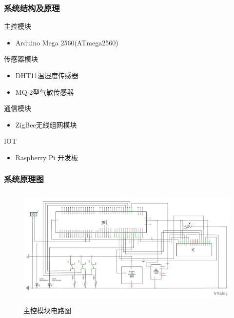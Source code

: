 ﻿\documentclass{beamer}
\begin{document}
\begin{frame}
  \frametitle{系统结构及原理}
  \begin{block}{主控模块}
	\begin{itemize}
		\item Arduino Mega 2560(ATmega2560)
	\end{itemize}
\end{block}
\pause
  \begin{block}{传感器模块}
	\begin{itemize}
		\item DHT11温湿度传感器
        \item MQ-2型气敏传感器
	\end{itemize}
\end{block}
\pause
\begin{block}{通信模块}
	\begin{itemize}
		\item ZigBee无线组网模块
	\end{itemize}
\end{block}
\pause
\begin{block}{IOT}
	\begin{itemize}
		\item Raspberry Pi 开发板
	\end{itemize}
\end{block}
\end{frame}

\begin{frame}
\frametitle{系统原理图}

\begin{figure}
\centering
   \includegraphics[height=6cm]{./img/U}
  \caption{主控模块电路图}
  \label{fig:visual}
\end{figure}

\end{frame}
\end{document}
